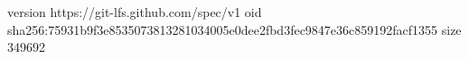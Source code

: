 version https://git-lfs.github.com/spec/v1
oid sha256:75931b9f3e8535073813281034005e0dee2fbd3fec9847e36c859192facf1355
size 349692
